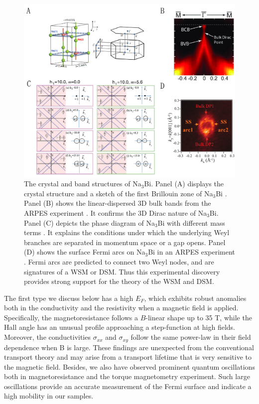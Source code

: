 \begin{figure}[!htbp]
  \begin{center}
\includegraphics[width=1\linewidth]{ch-na3bi/figures/Na3Bi_band.pdf}
\caption{\label{figNa3Bi_band} The crystal and band structures of Na$_3$Bi. Panel (A) displays the crystal structure and a sketch of the first Brillouin zone of Na$_3$Bi \cite{Wang2012}. Panel (B) shows the linear-dispersed 3D bulk bands from the ARPES experiment \cite{Liu2014a}. It confirms the 3D Dirac nature of Na$_3$Bi. Panel (C) depicts the phase diagram of Na$_3$Bi with different mass terms \cite{Wang2012}. It explains the conditions under which the underlying Weyl branches are separated in momentum space or a gap opens. Panel (D) shows the surface Fermi arcs on Na$_3$Bi in an ARPES experiment \cite{Xu2015}. Fermi arcs are predicted to connect two Weyl nodes, and are signatures of a WSM or DSM. Thus this experimental discovery provides strong support for the theory of the WSM and DSM.
}
  \end{center}
\end{figure}

The first type we discuss below has a high $E_F$, which exhibits robust anomalies both in the conductivity and the resistivity when a magnetic field is applied\cite{Xiong2015a}. Specifically, the magnetoresistance follows a $B$-linear shape up to 35 T, while the Hall angle has an unusual profile approaching a step-function at high fields. Moreover, the conductivities $\sigma_{xx}$ and $\sigma_{xy}$ follow the same power-law in their field dependence when B is large. These findings are unexpected from the conventional transport theory and may arise from a transport lifetime that is very sensitive to the magnetic field. Besides, we also have observed prominent quantum oscillations both in magnetoresistance and the torque magnetometry experiment. Such large oscillations provide an accurate measurement of the Fermi surface and indicate a high mobility in our samples.

